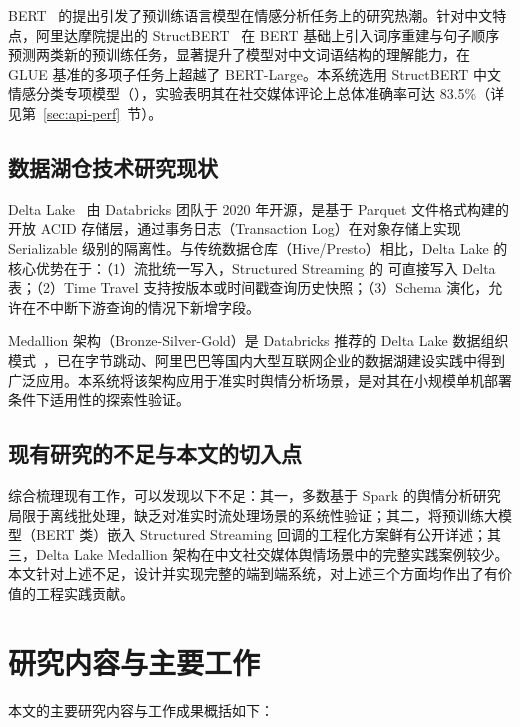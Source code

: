 BERT~\cite{devlin2019bert} 的提出引发了预训练语言模型在情感分析任务上的研究热潮。针对中文特点，阿里达摩院提出的 StructBERT~\cite{wang2020structbert} 在 BERT 基础上引入词序重建与句子顺序预测两类新的预训练任务，显著提升了模型对中文词语结构的理解能力，在 GLUE 基准的多项子任务上超越了 BERT-Large。本系统选用 StructBERT 中文情感分类专项模型（），实验表明其在社交媒体评论上总体准确率可达 83.5\%（详见第~\ref{sec:api-perf}~节）。

\subsection{数据湖仓技术研究现状}

Delta Lake~\cite{armbrust2020delta} 由 Databricks 团队于 2020 年开源，是基于 Parquet 文件格式构建的开放 ACID 存储层，通过事务日志（Transaction Log）在对象存储上实现 Serializable 级别的隔离性。与传统数据仓库（Hive/Presto）相比，Delta Lake 的核心优势在于：（1）流批统一写入，Structured Streaming 的  可直接写入 Delta 表；（2）Time Travel 支持按版本或时间戳查询历史快照；（3）Schema 演化，允许在不中断下游查询的情况下新增字段。

Medallion 架构（Bronze-Silver-Gold）是 Databricks 推荐的 Delta Lake 数据组织模式~\cite{databricks2021medallion}，已在字节跳动、阿里巴巴等国内大型互联网企业的数据湖建设实践中得到广泛应用。本系统将该架构应用于准实时舆情分析场景，是对其在小规模单机部署条件下适用性的探索性验证。

\subsection{现有研究的不足与本文的切入点}

综合梳理现有工作，可以发现以下不足：其一，多数基于 Spark 的舆情分析研究局限于离线批处理，缺乏对准实时流处理场景的系统性验证；其二，将预训练大模型（BERT 类）嵌入 Structured Streaming  回调的工程化方案鲜有公开详述；其三，Delta Lake Medallion 架构在中文社交媒体舆情场景中的完整实践案例较少。本文针对上述不足，设计并实现完整的端到端系统，对上述三个方面均作出了有价值的工程实践贡献。

\section{研究内容与主要工作}

本文的主要研究内容与工作成果概括如下：

